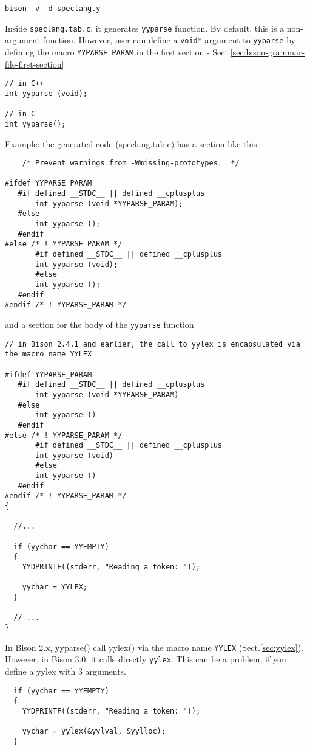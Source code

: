 \begin{verbatim}
bison -v -d speclang.y
\end{verbatim}

Inside \verb!speclang.tab.c!, it generates \verb!yyparse! function. By default,
this is a non-argument function. However, user can define a \verb!void*!
argument to \verb!yyparse! by defining the macro \verb!YYPARSE_PARAM! in the
first section - Sect.\ref{sec:bison-grammar-file-first-section}

\begin{verbatim}
// in C++
int yyparse (void);

// in C
int yyparse();
\end{verbatim}

Example: the generated code (speclang.tab.c)  has a section like this
\begin{verbatim}
    /* Prevent warnings from -Wmissing-prototypes.  */
    
#ifdef YYPARSE_PARAM
   #if defined __STDC__ || defined __cplusplus
       int yyparse (void *YYPARSE_PARAM);
   #else
       int yyparse ();
   #endif
#else /* ! YYPARSE_PARAM */
       #if defined __STDC__ || defined __cplusplus
       int yyparse (void);
       #else
       int yyparse ();
   #endif
#endif /* ! YYPARSE_PARAM */
\end{verbatim}
and a section for the body of the \verb!yyparse! function
\begin{verbatim}
// in Bison 2.4.1 and earlier, the call to yylex is encapsulated via the macro name YYLEX

#ifdef YYPARSE_PARAM
   #if defined __STDC__ || defined __cplusplus
       int yyparse (void *YYPARSE_PARAM)
   #else
       int yyparse ()
   #endif
#else /* ! YYPARSE_PARAM */
       #if defined __STDC__ || defined __cplusplus
       int yyparse (void)
       #else
       int yyparse ()
   #endif
#endif /* ! YYPARSE_PARAM */
{

  //... 
  
  if (yychar == YYEMPTY)
  {
    YYDPRINTF((stderr, "Reading a token: "));
    
    yychar = YYLEX;
  }
  
  // ...
}

\end{verbatim}

In Bison 2.x, yyparse() call yylex() via the macro name \verb!YYLEX! (Sect.\ref{sec:yylex}).
However, in Bison 3.0, it calls directly \verb!yylex!. This can be a problem, if you define a yylex with 3 arguments. 
\begin{verbatim}
  if (yychar == YYEMPTY)
  {
    YYDPRINTF((stderr, "Reading a token: "));
    
    yychar = yylex(&yylval, &yylloc);
  }
\end{verbatim}

